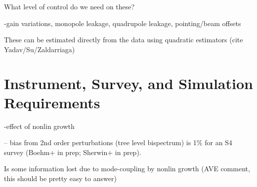 What level of control do we need on these?

-gain variations, monopole leakage, quadrupole leakage, pointing/beam offsets

These can be estimated directly from the data using quadratic estimators (cite Yadav/Su/Zaldarriaga)


\section{Instrument, Survey, and Simulation Requirements}\label{require}

-effect of nonlin growth

 -- bias from 2nd order perturbations (tree level bispectrum) is 1\% for an S4 survey (Boehm+ in prep; Sherwin+ in prep).  

Is some information lost due to mode-coupling by nonlin growth (AVE comment, this should be pretty easy to answer)





%

%


